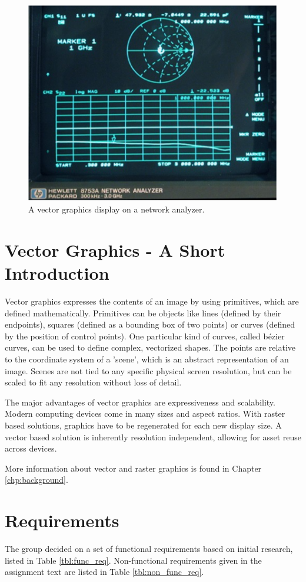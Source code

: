 \begin{figure}[h!]
    \centering
    \includegraphics[width=0.6\linewidth]{images/network-analyzer-vector-graphics-display.png}
    \caption{A vector graphics display on a network analyzer\cite{assignment-text}.}
    \label{fig:vector-display-network-analyzer}
\end{figure}

\section{Vector Graphics - A Short Introduction}
Vector graphics expresses the contents of an image by using primitives, which are defined mathematically.
Primitives can be objects like lines (defined by their endpoints), squares (defined as a bounding box of two points) or curves (defined by the position of control points).
One particular kind of curves, called bézier curves, can be used to define complex, vectorized shapes.
The points are relative to the coordinate system of a 'scene', which is an abstract representation of an image.
Scenes are not tied to any specific physical screen resolution, but can be scaled to fit any resolution without loss of detail.

The major advantages of vector graphics are expressiveness and scalability.
Modern computing devices come in many sizes and aspect ratios.
With raster based solutions, graphics have to be regenerated for each new display size.
A vector based solution is inherently resolution independent, allowing for asset reuse across devices.

More information about vector and raster graphics is found in Chapter \ref{chp:background}.

\section{Requirements}
\label{sec:requirements}
The group decided on a set of functional requirements based on initial research, listed in Table \ref{tbl:func_req}.
Non-functional requirements given in the assignment text are listed in Table \ref{tbl:non_func_req}.

